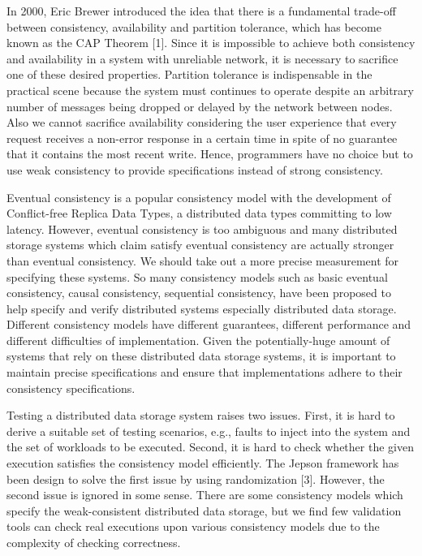 \documentclass[sigconf,review,screen,anonymous]{acmart}
\begin{document}
In 2000, Eric Brewer introduced the idea that there is a fundamental trade-off between consistency, availability and partition tolerance, which has become known as the CAP Theorem [1]. 
Since it is impossible to achieve both consistency and availability in a system with unreliable network, it is necessary to sacrifice one of these desired properties\cite{gilbert2012perspectives}. 
Partition tolerance is indispensable in the practical scene because the system must continues to operate despite an arbitrary number of messages being dropped or delayed by the network between nodes. 
Also we cannot sacrifice availability considering the user experience that every request receives a non-error response in a certain time in spite of no guarantee that it contains the most recent write. 
Hence, programmers have no choice but to use weak consistency to provide specifications instead of strong consistency. 

Eventual consistency is a popular consistency model with the development of Conflict-free Replica Data Types, a distributed data types committing to low latency. 
However, eventual consistency is too ambiguous and many distributed storage systems which claim satisfy eventual consistency are actually stronger than eventual consistency. 
We should take out a more precise measurement for specifying these systems. 
So many consistency models such as basic eventual consistency, causal consistency, sequential consistency, have been proposed to help specify and verify distributed systems especially distributed data storage. 
Different consistency models have different guarantees, different performance and different difficulties of implementation. 
Given the potentially-huge amount of systems that rely on these distributed data storage systems, it is important to maintain precise specifications and ensure that implementations adhere to their consistency specifications.

Testing a distributed data storage system raises two issues. 
First, it is hard to derive a suitable set of testing scenarios, e.g., faults to inject into the system and the set of workloads to be executed. 
Second, it is hard to check whether the given execution satisfies the consistency model efficiently. 
The Jepson framework has been design to solve the first issue by using randomization [3]. 
However, the second issue is ignored in some sense. 
There are some consistency models which specify the weak-consistent distributed data storage, 
but we find few validation tools can check real executions upon various consistency models due to the complexity of checking correctness. 
\end{document}

